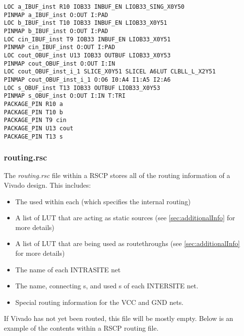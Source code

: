 \begin{lstlisting}[numbers=none]
LOC a_IBUF_inst R10 IOB33 INBUF_EN LIOB33_SING_X0Y50
PINMAP a_IBUF_inst O:OUT I:PAD 
LOC b_IBUF_inst T10 IOB33 INBUF_EN LIOB33_X0Y51
PINMAP b_IBUF_inst O:OUT I:PAD 
LOC cin_IBUF_inst T9 IOB33 INBUF_EN LIOB33_X0Y51
PINMAP cin_IBUF_inst O:OUT I:PAD 
LOC cout_OBUF_inst U13 IOB33 OUTBUF LIOB33_X0Y53
PINMAP cout_OBUF_inst O:OUT I:IN 
LOC cout_OBUF_inst_i_1 SLICE_X0Y51 SLICEL A6LUT CLBLL_L_X2Y51
PINMAP cout_OBUF_inst_i_1 O:O6 I0:A4 I1:A5 I2:A6 
LOC s_OBUF_inst T13 IOB33 OUTBUF LIOB33_X0Y53
PINMAP s_OBUF_inst O:OUT I:IN T:TRI 
PACKAGE_PIN R10 a
PACKAGE_PIN T10 b
PACKAGE_PIN T9 cin
PACKAGE_PIN U13 cout
PACKAGE_PIN T13 s
\end{lstlisting}

\subsubsection{routing.rsc}
The \textit{routing.rsc} file within a RSCP stores all of the routing
information of a Vivado design. This includes: 

\begin{itemize}
  \item The used   within each  (which
  specifies the internal routing)
  \item A list of LUT \bels that are acting as static sources (see
  \autoref{sec:additionalInfo} for more details)
  \item A list of LUT \bels that are being used as routethroughs (see
  \autoref{sec:additionalInfo} for more details) 
  \item The name of each INTRASITE net
  \item The name, connecting s, and used s
  of each INTERSITE net.
  \item Special routing information for the VCC and GND nets.
\end{itemize}

\noindent
If Vivado has not yet been routed, this file will be mostly empty. Below is
an example of the contents within a RSCP routing file.

